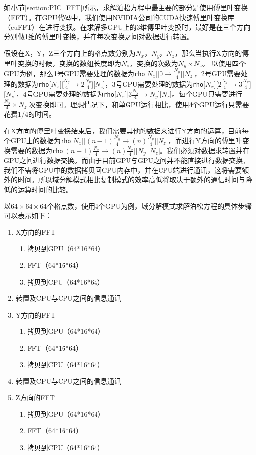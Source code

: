 如小节\ref{section:PIC_FFT}所示，求解泊松方程中最主要的部分是使用傅里叶变换（FFT）。在GPU代码中，我们使用NVIDIA公司的CUDA快速傅里叶变换库（cuFFT）\cite{nvidia2010cufft}在进行变换。在求解多GPU上的3维傅里叶变换时，最好是在三个方向分别做1维的傅里叶变换，并在每次变换之间对数据进行转置。

假设在X，Y，Z三个方向上的格点数分别为$N_x$，$N_y$，$N_z$，那么当执行X方向的傅里叶变换的时候，变换的数组长度即为$N_x$，变换的次数为$N_y \times N_z$。 以使用四个GPU为例，那么1号GPU需要处理的数据为\verb'rho'[$N_x$][$0 \rightarrow \frac{N_y}{4}$][$N_z$]，2号GPU需要处理的数据为\verb'rho'[$N_x$][$\frac{N_y}{4} \rightarrow 2\frac{N_y}{4}$][$N_z$]，3号GPU需要处理的数据为\verb'rho'[$N_x$][$2\frac{N_y}{4}\rightarrow 3\frac{N_y}{4}$][$N_z$]，4号GPU需要处理的数据为\verb'rho'[$N_x$][$3\frac{N_y}{4}\rightarrow N_y$][$N_z$]。每个GPU只需要进行$\frac{N_y}{4} \times N_z$ 次变换即可。理想情况下，和单GPU运行相比，使用4个GPU运行只需要花费1/4的时间。

在X方向的傅里叶变换结束后，我们需要其他的数据来进行Y方向的运算，目前每个GPU上的数据为\verb'rho'[$N_x$][$(n-1)\frac{N_y}{4}\rightarrow (n)\frac{N_y}{4}$][$N_z$]，而进行Y方向的傅里叶变换需要的数据为\verb'rho'[$(n-1)\frac{N_x}{4}\rightarrow (n)\frac{N_x}{4}$][$N_y$][$N_z$]。我们必须对数据求转置并在GPU之间进行数据交换。而由于目前GPU与GPU之间并不能直接进行数据交换，我们不需将GPU中的数据拷贝回CPU内存中，并在CPU端进行通讯，这将需要额外的时间。所以域分解模式相比复制模式的效率高低将取决于额外的通信时间与降低的运算时间的比较。

以$64 \times 64 \times 64$个格点数，使用4个GPU为例，域分解模式求解泊松方程的具体步骤可以表示如下：
\begin{enumerate}
  \item X方向的FFT
  \begin{enumerate}
    \item 拷贝到GPU（64*16*64）
    \item FFT（64*16*64）
    \item 拷贝到CPU（64*16*64）
  \end{enumerate}
  \item 转置及CPU与CPU之间的信息通讯
  \item Y方向的FFT
  \begin{enumerate}
    \item 拷贝到GPU（64*16*64）
    \item FFT（64*16*64）
    \item 拷贝到CPU（64*16*64）
  \end{enumerate}
  \item 转置及CPU与CPU之间的信息通讯
  \item Z方向的FFT
  \begin{enumerate}
    \item 拷贝到GPU（64*16*64）
    \item FFT（64*16*64）
    \item 拷贝到CPU（64*16*64）
  \end{enumerate}
\end{enumerate}

